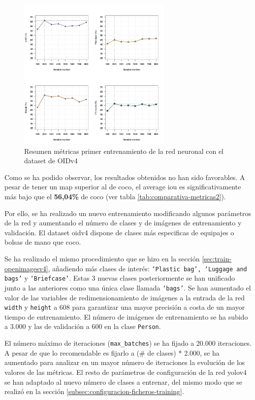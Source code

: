 \begin{figure}[ht]
\centering
\includegraphics[width=0.67\textwidth]{img/chapters/resultados/metricas/metrics-train1.png}
\caption{\label{fig:metrics-train1}Resumen métricas primer entrenamiento de la red neuronal con el dataset de OIDv4}
\end{figure}

Como se ha podido observar, los resultados obtenidos no han sido favorables. A pesar de tener un \gls{map} superior al de \gls{coco}, el average \gls{iou} es significativamente más bajo que el \textbf{56,04\%} de \gls{coco} (ver tabla \ref{tab:comparativa-metricas2}).

Por ello, se ha realizado un nuevo entrenamiento modificando algunos parámetros de la red y aumentando el número de clases y de imágenes de entrenamiento y validación. El dataset \gls{oidv4} dispone de clases más especificas de equipajes o bolsas de mano que \gls{coco}.

Se ha realizado el mismo procedimiento que se hizo en la sección \ref{sec:train-openimagesv4}, añadiendo más clases de interés: \texttt{`Plastic bag', `Luggage and bags'} y \texttt{`Briefcase'}. Estas 3 nuevas clases posteriormente se han unificado junto a las anteriores como una única clase llamada \texttt{`bags'}. Se han aumentado el valor de las variables de redimensionamiento de imágenes a la entrada de la red \texttt{width} y \texttt{height} a 608 para garantizar una mayor precisión a costa de un mayor tiempo de entrenamiento. El número de imágenes de entrenamiento se ha subido a 3.000 y las de validación a 600 en la clase \texttt{Person}.

El número máximo de iteraciones (\texttt{max\_batches}) se ha fijado a 20.000 iteraciones. A pesar de que lo recomendable es fijarlo a (\# de clases) * 2.000, se ha aumentado para analizar en un mayor número de iteraciones la evolución de los valores de las métricas. El resto de parámetros de configuración de la red \gls{yolov4} se han adaptado al nuevo número de clases a entrenar, del mismo modo que se realizó en la sección \ref{subsec:configuracion-ficheros-training}.

